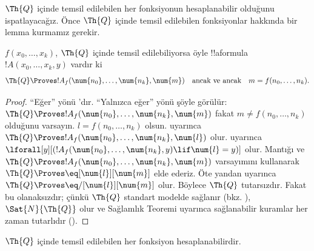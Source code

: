 


$\Th{Q}$ içinde temsil edilebilen her fonksiyonun hesaplanabilir olduğunu
ispatlayacağız. Önce $\Th{Q}$ içinde temsil edilebilen fonksiyonlar hakkında
bir lemma kurmamız gerekir.

\begin{lem}
  $f(x_0, \dots, x_k)$, $\Th{Q}$ içinde temsil edilebiliyorsa öyle
  !!a{formula}~$!A(x_0, \dots, x_k, y)$ vardır ki
  \[
  \Th{Q} \Proves !A_f(\num{n_0}, \dots, \num{n_k}, \num{m})
  \quad\text{ancak ve ancak}\quad m = f(n_0, \dots, n_k).
  \]
\end{lem}

\begin{proof}
  ``Eğer'' yönü
'dır. ``Yalnızca
eğer'' yönü şöyle görülür: $\Th{Q} \Proves !A_f(\num{n_0},
\dots, \num{n_k}, \num{m})$ fakat $m \neq f(n_0, \dots, n_k)$ olduğunu
varsayın. $l=f(n_0,\dots,n_k)$ olsun.
 uyarınca
$\Th{Q} \Proves !A_f(\num{n_0}, \dots, \num{n_k}, \num{l})$ olur.
 uyarınca
$\lforall[y][(!A_f(\num{n_0}, \dots, \num{n_k}, y) \lif \num{l} =
y)]$ olur. Mantığı ve $\Th{Q} \Proves
!A_f(\num{n_0}, \dots, \num{n_k}, \num{m})$ varsayımını kullanarak
$\Th{Q} \Proves \eq[\num{l}][\num{m}]$ elde ederiz. Öte yandan
 uyarınca $\Th{Q} \Proves
\eq/[\num{l}][\num{m}]$ olur. Böylece $\Th{Q}$ tutarsızdır. Fakat bu
olanaksızdır; çünkü $\Th{Q}$ standart modelde sağlanır (bkz.
), $\Sat{N}{\Th{Q}}$ olur ve
Sağlamlık Teoremi uyarınca sağlanabilir kuramlar her zaman tutarlıdır
().
\end{proof}

\begin{lem}
$\Th{Q}$ içinde temsil edilebilen her fonksiyon hesaplanabilirdir.
\end{lem}

